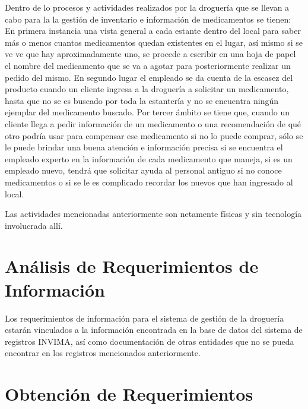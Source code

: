 Dentro de lo procesos y actividades realizados por la droguería que se llevan a cabo para la la gestión de inventario e información de medicamentos se tienen:
En primera instancia una vista general a cada estante dentro del local para saber más o menos cuantos medicamentos quedan existentes en el lugar, así mismo si se ve ve que hay aproximadamente uno, se procede a escribir en una hoja de papel el nombre del medicamento que se va a agotar para posteriormente realizar un pedido del mismo. 
En segundo lugar el empleado se da cuenta de la escasez del producto cuando un cliente ingresa a la droguería a solicitar un medicamento, hasta que no se es buscado por toda la estantería  y no se encuentra ningún ejemplar del medicamento buscado. 
Por tercer ámbito se tiene que, cuando un cliente llega a pedir información de un medicamento o una recomendación de qué otro podría usar para compensar ese medicamento si no lo puede comprar, sólo se le puede brindar una buena atención e información precisa si se encuentra el empleado experto en la información de cada medicamento que maneja, si es un empleado nuevo, tendrá que solicitar ayuda al personal antiguo si no conoce medicamentos o si se le es complicado recordar los nuevos que han ingresado al local.

Las actividades mencionadas anteriormente son netamente físicas y sin tecnología involucrada allí.


\section{An\'alisis de Requerimientos de Informaci\'on}
Los requerimientos de información para el sistema de gestión de la droguería estarán vinculados a la información encontrada en la base de datos del sistema de registros INVIMA, así como documentación de otras entidades que no se pueda encontrar en los registros mencionados anteriormente.


\section{Obtenci\'on de Requerimientos}
